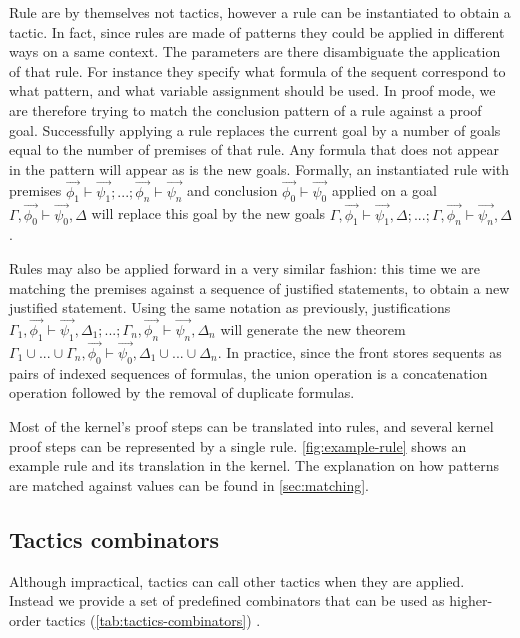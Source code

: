 Rule are by themselves not tactics, however a rule can be instantiated to obtain a tactic. In fact, since rules are made of patterns they could be applied in different ways on a same context. The parameters are there disambiguate the application of that rule. For instance they specify what formula of the sequent correspond to what pattern, and what variable assignment should be used. In proof mode, we are therefore trying to match the conclusion pattern of a rule against a proof goal. Successfully applying a rule replaces the current goal by a number of goals equal to the number of premises of that rule. Any formula that does not appear in the pattern will appear as is the new goals. Formally, an instantiated rule with premises $\vec{\phi_1} \vdash \vec{\psi_1}; ...; \vec{\phi_n} \vdash \vec{\psi_n}$ and conclusion $\vec{\phi_0} \vdash \vec{\psi_0}$ applied on a goal $\Gamma, \vec{\phi_0} \vdash \vec{\psi_0}, \Delta$ will replace this goal by the new goals $\Gamma, \vec{\phi_1} \vdash \vec{\psi_1}, \Delta; ...; \Gamma, \vec{\phi_n} \vdash \vec{\psi_n}, \Delta$.

Rules may also be applied forward in a very similar fashion: this time we are matching the premises against a sequence of justified statements, to obtain a new justified statement. Using the same notation as previously, justifications $\Gamma_1, \vec{\phi_1} \vdash \vec{\psi_1}, \Delta_1; ...; \Gamma_n, \vec{\phi_n} \vdash \vec{\psi_n}, \Delta_n$ will generate the new theorem $\Gamma_1 \cup ... \cup \Gamma_n, \vec{\phi_0} \vdash \vec{\psi_0}, \Delta_1 \cup ... \cup \Delta_n$. In practice, since the front stores sequents as pairs of indexed sequences of formulas, the union operation is a concatenation operation followed by the removal of duplicate formulas.

Most of the kernel's proof steps can be translated into rules, and several kernel proof steps can be represented by a single rule. \autoref{fig:example-rule} shows an example rule and its translation in the kernel. The explanation on how patterns are matched against values can be found in \autoref{sec:matching}.

\subsection{Tactics combinators}

Although impractical, tactics can call other tactics when they are applied. Instead we provide a set of predefined combinators that can be used as higher-order tactics (\autoref{tab:tactics-combinators}) \cite{Milner1984}.

